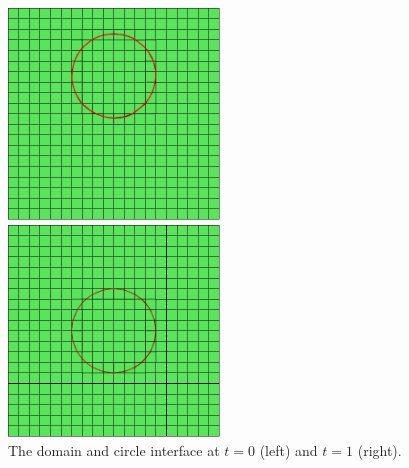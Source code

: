 \documentclass[notheorems,serif]{beamer}
\begin{document}
\begin{CJK}{UTF8}{gkai}
\begin{frame}
\begin{figure}[H]
    \begin{minipage}[t]{0.49\linewidth}
        \centering
        \includegraphics[width=0.5\textwidth]{../figures/movingmaxwell/circle_interface_0.pdf}
    \end{minipage}
    \begin{minipage}[t]{0.49\linewidth}
        \centering
        \includegraphics[width=0.5\textwidth]{../figures/movingmaxwell/circle_interface_1.pdf}
    \end{minipage}
    \caption{The domain and circle interface at $t=0$ (left) and $t=1$ (right).}
\end{figure}
\end{frame}


\end{CJK}
\end{document}
